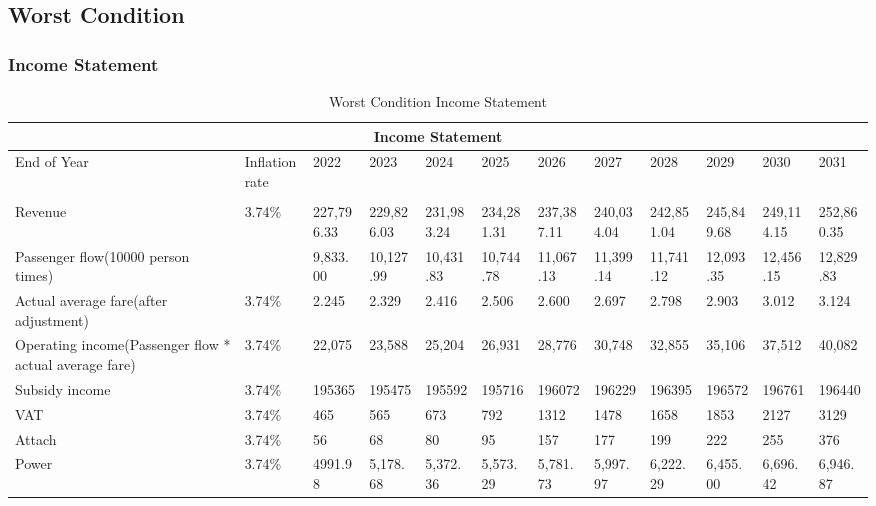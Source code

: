 \documentclass[12pt]{article}
\begin{document}
\begin{landscape}
\subsection{Worst Condition}
\subsubsection{Income Statement}
\begin{table}[htbp]
\scriptsize
  \centering
  \caption{Worst Condition Income Statement}
    \begin{tabular}{|p{9.91em}|l|l|l|l|l|l|l|l|l|l|l|}
    \toprule
    \multicolumn{12}{|c|}{\textbf{Income Statement}} \\
    \hline
    End of Year & \multicolumn{1}{p{5.91em}|}{Inflation rate} & 2022  & 2023  & 2024  & 2025  & 2026  & 2027  & 2028  & 2029  & 2030  & 2031 \\
    \hline
    \multicolumn{1}{|l|}{} &       &       &       &       &       &       &       &       &       &       &  \\
    \hline
    Revenue & 3.74\% & 227,796.33 & 229,826.03 & 231,983.24 & 234,281.31 & 237,387.11 & 240,034.04 & 242,851.04 & 245,849.68 & 249,114.15 & 252,860.35 \\
    \hline
    Passenger flow(10000 person times) &       & 9,833.00 & 10,127.99 & 10,431.83 & 10,744.78 & 11,067.13 & 11,399.14 & 11,741.12 & 12,093.35 & 12,456.15 & 12,829.83 \\
    \hline
    Actual average fare(after adjustment) & 3.74\% & 2.245 & 2.329 & 2.416 & 2.506 & 2.600 & 2.697 & 2.798 & 2.903 & 3.012 & 3.124 \\
    \hline
    Operating income(Passenger flow * actual average fare) & 3.74\% & 22,075 & 23,588 & 25,204 & 26,931 & 28,776 & 30,748 & 32,855 & 35,106 & 37,512 & 40,082 \\
    \hline
    Subsidy income & 3.74\% & 195365 & 195475 & 195592 & 195716 & 196072 & 196229 & 196395 & 196572 & 196761 & 196440 \\
    \hline
    VAT   & 3.74\% & 465   & 565   & 673   & 792   & 1312  & 1478  & 1658  & 1853  & 2127  & 3129 \\
    \hline
    Attach & 3.74\% & 56    & 68    & 80    & 95    & 157   & 177   & 199   & 222   & 255   & 376 \\
    \hline
    Power & 3.74\% & 4991.98 & 5,178.68 & 5,372.36 & 5,573.29 & 5,781.73 & 5,997.97 & 6,222.29 & 6,455.00 & 6,696.42 & 6,946.87 \\

\end{tabular}
\end{table}
\end{landscape}
\end{document}
